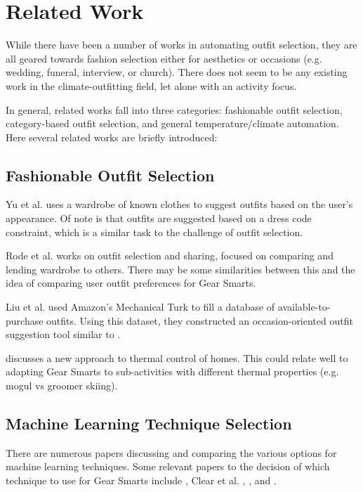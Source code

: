 \section{Related Work}
\label{section:relatedwork}
While there have been a number of works in automating outfit selection, they are all geared towards
fashion selection either for aesthetics or occasions (e.g. wedding, funeral, interview, or church).
There does not seem to be any existing work in the climate-outfitting field, let alone with an
activity focus.

In general, related works fall into three categories: fashionable outfit selection, category-based
outfit selection, and general temperature/climate automation. Here several related works are briefly introduced:

\subsection{Fashionable Outfit Selection}
Yu et al. \cite{Dressup} uses a wardrobe of known clothes to suggest outfits based on the user's appearance.
Of note is that outfits are suggested based on a dress code constraint, which is a similar task to
the challenge of outfit selection.

Rode et al. \cite{SmartCloset} works on outfit selection and sharing, focused on comparing and lending wardrobe
to others. There may be some similarities between this and the idea of comparing user outfit preferences
for Gear Smarts.

Liu et al. \cite{MagicCloset} used Amazon's Mechanical Turk to fill a database of available-to-purchase outfits.
Using this dataset, they constructed an occasion-oriented outfit suggestion tool similar to \cite{Dressup}.

\cite{ThermalComfort} discusses a new approach to thermal control of homes. This could relate well to
adapting Gear Smarts to sub-activities with different thermal properties (e.g. mogul vs groomer skiing).

\subsection{Machine Learning Technique Selection}
There are numerous papers discussing and comparing the various options for machine learning techniques.
Some relevant papers to the decision of which technique to use for Gear Smarts include \cite{ML:MapReduceClusters},
Clear et al. \cite{ML:ManufacturingSystems}, \cite{ML:IPTraffic}, and \cite{ML:GeoMapping}.
